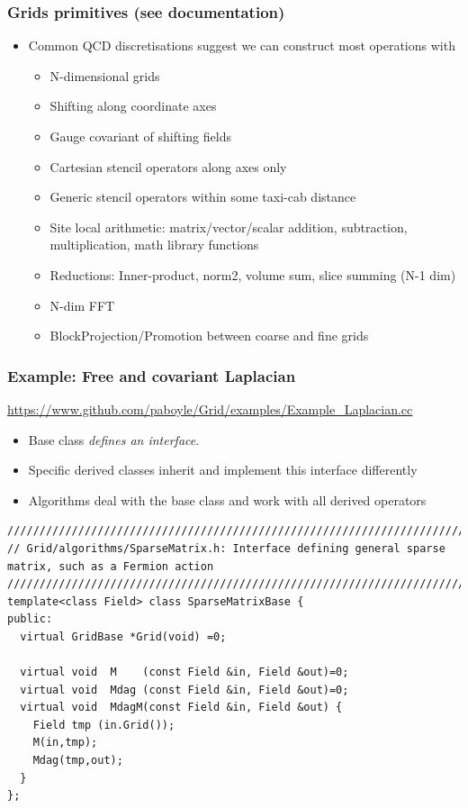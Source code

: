 \documentclass[pdf,ps,8pt]{beamer}
\newcommand{\link}[1]{\href{#1}{ {\color{blue} #1} }}
\begin{document}
\begin{frame}[fragile]\small\frametitle{ Grids primitives (see documentation)}

  \begin{itemize}
  \item Common QCD discretisations suggest we can construct most operations with
    \begin{itemize}
  \item N-dimensional grids
  \item Shifting along coordinate axes
  \item Gauge covariant of shifting fields
  \item Cartesian stencil operators along axes only
  \item Generic stencil operators within some taxi-cab distance
  \item Site local arithmetic: matrix/vector/scalar addition, subtraction, multiplication, math library functions
  \item Reductions: Inner-product, norm2, volume sum, slice summing (N-1 dim)
  \item N-dim FFT
  \item BlockProjection/Promotion between coarse and fine grids
  \end{itemize}
  \end{itemize}

\end{frame}


\begin{frame}[fragile]\small\frametitle{ Example: Free and covariant Laplacian}
  \link{https://www.github.com/paboyle/Grid/examples/Example\_Laplacian.cc}
\begin{itemize}
\item  Base class \emph{defines an interface}.
\item  Specific derived classes inherit and implement this interface differently
\item  Algorithms deal with the base class and work with all derived operators
 \end{itemize}
{\tiny

\begin{verbatim}
/////////////////////////////////////////////////////////////////////////////////////////////
// Grid/algorithms/SparseMatrix.h: Interface defining general sparse matrix, such as a Fermion action
/////////////////////////////////////////////////////////////////////////////////////////////
template<class Field> class SparseMatrixBase {
public:
  virtual GridBase *Grid(void) =0;

  virtual void  M    (const Field &in, Field &out)=0;
  virtual void  Mdag (const Field &in, Field &out)=0;
  virtual void  MdagM(const Field &in, Field &out) {
    Field tmp (in.Grid());
    M(in,tmp);
    Mdag(tmp,out);
  }
};
  \end{verbatim}
}
\end{frame}
\end{document}
